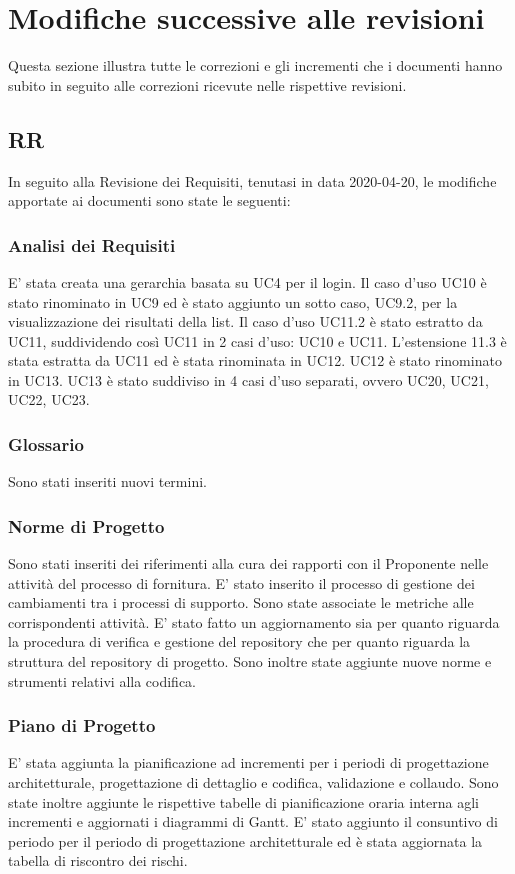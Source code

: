 \section{Modifiche successive alle revisioni}
Questa sezione illustra tutte le correzioni e gli incrementi che i documenti hanno subito in seguito alle correzioni ricevute nelle rispettive revisioni.

\subsection{RR}
In seguito alla Revisione dei Requisiti, tenutasi in data 2020-04-20, le modifiche apportate ai documenti sono state le seguenti:

	\subsubsection*{Analisi dei Requisiti}
	E' stata creata una gerarchia basata su UC4 per il login. Il caso d'uso UC10 è stato rinominato in UC9 ed è stato aggiunto un sotto caso, UC9.2, per la visualizzazione dei risultati della list. Il caso d'uso UC11.2 è stato estratto da UC11, suddividendo così UC11 in 2 casi d'uso: UC10 e UC11.  L’estensione 11.3 è stata estratta da UC11 ed è stata rinominata in UC12. UC12 è stato rinominato in UC13. UC13 è stato suddiviso in 4 casi d'uso separati, ovvero UC20, UC21, UC22, UC23. 
	
	\subsubsection*{Glossario}
	Sono stati inseriti nuovi termini.
	
	\subsubsection*{Norme di Progetto}
	Sono stati inseriti dei riferimenti alla cura dei rapporti con il Proponente nelle attività del processo di fornitura. E' stato inserito il processo di gestione dei cambiamenti tra i processi di supporto. Sono state associate le metriche alle corrispondenti attività. 
	E' stato fatto un aggiornamento sia per quanto riguarda la procedura di verifica e gestione del repository che per quanto riguarda la struttura del repository di progetto. Sono inoltre state aggiunte nuove norme e strumenti relativi alla codifica.
	
	\subsubsection*{Piano di Progetto}
	E' stata aggiunta la pianificazione ad incrementi per i periodi di progettazione architetturale, progettazione di dettaglio e codifica, validazione e collaudo. Sono state inoltre aggiunte le rispettive tabelle di pianificazione oraria interna agli incrementi e aggiornati i diagrammi di Gantt. 
E' stato aggiunto il consuntivo di periodo per il periodo di progettazione architetturale ed è stata aggiornata la tabella di riscontro dei rischi. 
	
